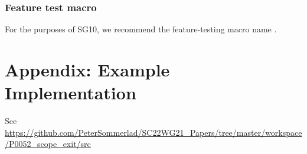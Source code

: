 \documentclass[ebook,11pt,article]{memoir}
\begin{document}
\subsection {Feature test macro}
For the purposes of SG10, we recommend the feature-testing macro name .

\chapter{Appendix: Example Implementation} 
See 
\url{https://github.com/PeterSommerlad/SC22WG21_Papers/tree/master/workspace/P0052_scope_exit/src}
\end{document}
